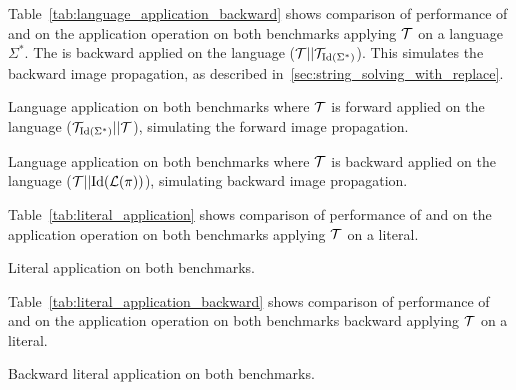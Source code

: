 Table~\ref{tab:language_application_backward} shows comparison of performance of \mata and \mona on the application operation on both benchmarks applying $\mathcal{T}$ on a language $\Sigma^*$.
The \nft is backward applied on the language ($\mathcal{T} || \mathcal{T}_{\text{Id}(\Sigma^*)}$).
This simulates the backward image propagation, as described in~\ref{sec:string_solving_with_replace}.

\begin{table}[ht]
  \centering
  
  \caption{
    Language application on both benchmarks where $\mathcal{T}$ is forward applied on the language ($\mathcal{T}_{\text{Id}(\Sigma^*)} || \mathcal{T}$), simulating the forward image propagation.
  }
  \label{tab:language_application}
\end{table}

\begin{table}[ht]
  \centering
  
  \caption{
    Language application on both benchmarks where $\mathcal{T}$ is backward applied on the language ($\mathcal{T} || \text{Id}(\mathcal{L}(\pi))$), simulating backward image propagation.
  }
  \label{tab:language_application_backward}
\end{table}


Table~\ref{tab:literal_application} shows comparison of performance of \mata and \mona on the application operation on both benchmarks applying $\mathcal{T}$ on a literal.

\begin{table}[ht]
  \centering
  
  \caption{
    Literal application on both benchmarks.
  }
  \label{tab:literal_application}
\end{table}

Table~\ref{tab:literal_application_backward} shows comparison of performance of \mata and \mona on the application operation on both benchmarks backward applying $\mathcal{T}$ on a literal.

\begin{table}[ht]
  \centering
  
  \caption{
    Backward literal application on both benchmarks.
  }
  \label{tab:literal_application_backward}
\end{table}

